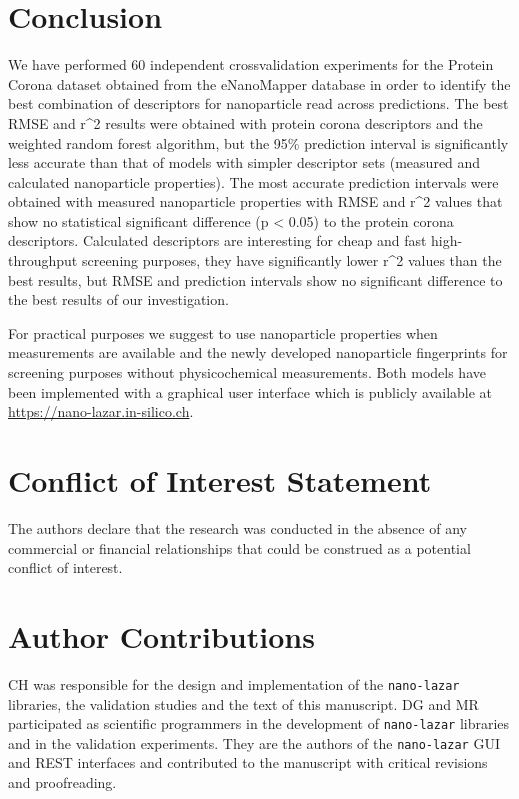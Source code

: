\documentclass[utf8]{frontiersHLTH} %
\begin{document}
\section{Conclusion}\label{conclusion}

We have performed 60 independent crossvalidation experiments for the
Protein Corona dataset obtained from the eNanoMapper database in order
to identify the best combination of descriptors for nanoparticle read
across predictions. The best RMSE and r\^{}2 results were obtained with
protein corona descriptors and the weighted random forest algorithm, but
the 95\% prediction interval is significantly less accurate than that of
models with simpler descriptor sets (measured and calculated
nanoparticle properties). The most accurate prediction intervals were
obtained with measured nanoparticle properties with RMSE and r\^{}2
values that show no statistical significant difference (p \textless{}
0.05) to the protein corona descriptors. Calculated descriptors are
interesting for cheap and fast high-throughput screening purposes, they
have significantly lower r\^{}2 values than the best results, but RMSE
and prediction intervals show no significant difference to the best
results of our investigation.

For practical purposes we suggest to use nanoparticle properties when
measurements are available and the newly developed nanoparticle
fingerprints for screening purposes without physicochemical
measurements. Both models have been implemented with a graphical user
interface which is publicly available at
\url{https://nano-lazar.in-silico.ch}.

\section{Conflict of Interest
Statement}\label{conflict-of-interest-statement}

The authors declare that the research was conducted in the absence of
any commercial or financial relationships that could be construed as a
potential conflict of interest.

\section{Author Contributions}\label{author-contributions}

CH was responsible for the design and implementation of the
\texttt{nano-lazar} libraries, the validation studies and the text of
this manuscript. DG and MR participated as scientific programmers in the
development of \texttt{nano-lazar} libraries and in the validation
experiments. They are the authors of the \texttt{nano-lazar} GUI and
REST interfaces and contributed to the manuscript with critical
revisions and proofreading.
\end{document}
